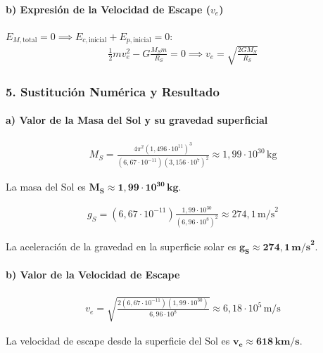 \paragraph*{b) Expresión de la Velocidad de Escape ($v_e$)}
$E_{M, \text{total}} = 0 \implies E_{c, \text{inicial}} + E_{p, \text{inicial}} = 0$:
\begin{gather}
    \frac{1}{2} m v_e^2 - G \frac{M_S m}{R_S} = 0 \implies v_e = \sqrt{\frac{2 G M_S}{R_S}}
\end{gather}

\subsubsection*{5. Sustitución Numérica y Resultado}
\paragraph*{a) Valor de la Masa del Sol y su gravedad superficial}
\begin{gather}
    M_S = \frac{4\pi^2 (1,496 \cdot 10^{11})^3}{(6,67 \cdot 10^{-11})(3,156 \cdot 10^7)^2} \approx 1,99 \cdot 10^{30} \, \text{kg}
\end{gather}
\begin{cajaresultado}
    La masa del Sol es $\boldsymbol{M_S \approx 1,99 \cdot 10^{30} \, \textbf{kg}}$.
\end{cajaresultado}
\medskip
\begin{gather}
    g_S = (6,67 \cdot 10^{-11}) \frac{1,99 \cdot 10^{30}}{(6,96 \cdot 10^8)^2} \approx 274,1 \, \text{m/s}^2
\end{gather}
\begin{cajaresultado}
    La aceleración de la gravedad en la superficie solar es $\boldsymbol{g_S \approx 274,1 \, \textbf{m/s}^2}$.
\end{cajaresultado}

\paragraph*{b) Valor de la Velocidad de Escape}
\begin{gather}
    v_e = \sqrt{\frac{2 (6,67 \cdot 10^{-11}) (1,99 \cdot 10^{30})}{6,96 \cdot 10^8}} \approx 6,18 \cdot 10^5 \, \text{m/s}
\end{gather}
\begin{cajaresultado}
    La velocidad de escape desde la superficie del Sol es $\boldsymbol{v_e \approx 618 \, \textbf{km/s}}$.
\end{cajaresultado}

